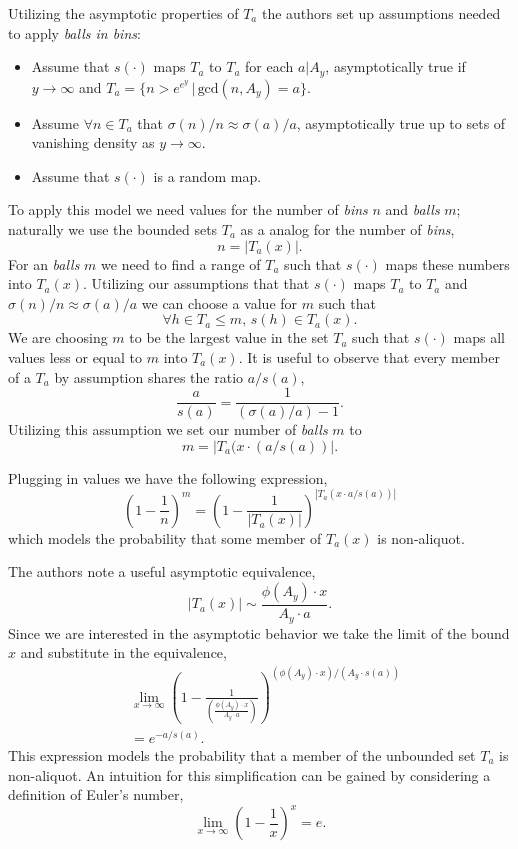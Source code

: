 \documentclass{article}
\theoremstyle{definition}
\begin{document}
Utilizing the asymptotic properties of $T_a$ the authors set up assumptions needed to apply \textit{balls in bins}:
\begin{itemize}
    \item Assume that $s(\cdot)$ maps $T_a$ to $T_a$ for each $a | A_y$, asymptotically true if $y \to \infty$ and $T_a = \{n > e^{e^y} \,|\, \text{gcd}(n, A_y) = a\}$.
    \item Assume $\forall n \in T_a $ that $\sigma(n)/n \approx \sigma(a)/a $, asymptotically true up to sets of vanishing density as $y \to \infty$.
    \item Assume that $s(\cdot)$ is a random map.
\end{itemize}

To apply this model we need values for the number of \textit{bins} $n$ and \textit{balls} $m$; naturally we use the bounded sets $T_a$ as a analog for the number of \textit{bins},
$$n = |T_a(x)|.$$
For an \textit{balls} $m$ we need to find a range of $T_a$ such that $s(\cdot)$ maps these numbers into $T_a(x)$. Utilizing our assumptions that that $s(\cdot)$ maps $T_a$ to $T_a$ and $\sigma(n)/n \approx \sigma(a)/a$ we can choose a value for $m$ such that
$$\forall h \in T_a \leq m,\, s(h) \in T_a(x).$$
We are choosing $m$ to be the largest value in the set $T_a$ such that $s(\cdot)$ maps all values less or equal to $m$ into $T_a(x)$. It is useful to observe that every member of a $T_a$ by assumption shares the ratio $a / s(a)$,
$$\frac{a}{s(a)} = \frac{1}{(\sigma(a)/a)-1}.$$
Utilizing this assumption we set our number of \textit{balls} $m$ to
$$m = |T_a(x \cdot (a/s(a))|.$$

Plugging in values we have the following expression,
$$\left(1-\frac{1}{n}\right)^m = \left(1-\frac{1}{|T_a(x)|}\right)^{|T_a(x\cdot a/s(a))|} $$
which models the probability that some member of $T_a(x)$ is non-aliquot.

The authors note a useful asymptotic equivalence,
$$|T_a(x)|  \sim  \frac{\phi(A_y) \cdot x}{ A_y \cdot a}.$$
Since we are interested in the asymptotic behavior we take the limit of the bound $x$ and substitute in the equivalence, 
\begin{align*}
    &\lim_{x \to \infty}\left(1-\frac{1}{\left(\frac{\phi(A_y) \cdot x}{ A_y \cdot a}\right)}\right)^{(\phi(A_y) \cdot x)/( A_y \cdot s(a))}\\
    &= e^{-a/s(a)}.
\end{align*}
This expression models the probability that a member of the unbounded set $T_a$ is non-aliquot. An intuition for this simplification can be gained by considering a definition of Euler's number,  
$$\lim_{x \to \infty} (1- \frac{1}{x})^x = e.$$
\end{document}
